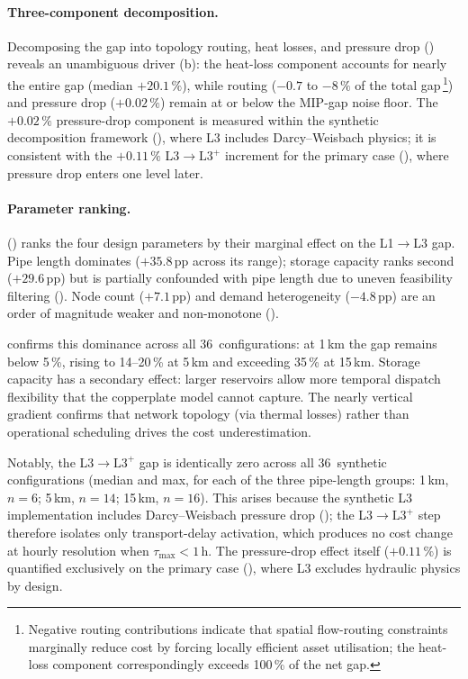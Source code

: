 \documentclass[a4paper,fleqn]{cas-dc}
\newcommand{\Lplus}{\mathrm{L3}^{+}}
\begin{document}
\paragraph{Three-component decomposition.}
Decomposing the gap into topology routing, heat losses, and
pressure drop () reveals an
unambiguous driver (b): the heat-loss
component accounts for nearly the entire gap (median
$+20.1\,\%$), while routing ($-0.7$ to $-8\,\%$ of the total
gap\,\footnote{Negative routing contributions indicate that
spatial flow-routing constraints marginally reduce cost by
forcing locally efficient asset utilisation; the heat-loss
component correspondingly exceeds 100\,\% of the net gap.}) and
pressure drop ($+0.02\,\%$) remain at or below the MIP-gap
noise floor. The $+0.02\,\%$ pressure-drop component is
measured within the synthetic decomposition framework
(), where L3 includes
Darcy--Weisbach physics; it is consistent with the $+0.11\,\%$
L3$\to\Lplus$ increment for the primary case
(), where pressure drop enters one
level later.

\paragraph{Parameter ranking.}
 () ranks the
four design parameters by their marginal effect on the L1$\to$L3
gap. Pipe length dominates ($+35.8$\,pp across its range);
storage capacity ranks second ($+29.6$\,pp) but is partially
confounded with pipe length due to uneven feasibility filtering
(). Node count ($+7.1$\,pp) and demand
heterogeneity ($-4.8$\,pp) are an order of magnitude weaker and
non-monotone ().

 confirms this dominance across all
36~configurations: at 1\,km the gap remains below 5\,\%, rising
to 14--20\,\% at 5\,km and exceeding 35\,\% at 15\,km. Storage
capacity has a secondary effect: larger reservoirs allow more
temporal dispatch flexibility that the copperplate model cannot
capture. The nearly vertical gradient confirms that network
topology (via thermal losses) rather than operational scheduling
drives the cost underestimation.

Notably, the L3$\to\Lplus$ gap is identically zero across all
36~synthetic configurations (median and max, for each of the
three pipe-length groups: 1\,km, $n{=}6$; 5\,km, $n{=}14$;
15\,km, $n{=}16$). This
arises because the synthetic L3 implementation includes
Darcy--Weisbach pressure drop ();
the L3$\to\Lplus$ step therefore isolates only transport-delay
activation, which produces no cost change at hourly resolution
when $\tau_{\max} < 1$\,h. The pressure-drop effect itself
($+0.11\,\%$) is quantified exclusively on the primary case
(), where L3 excludes hydraulic physics
by design.
\end{document}
